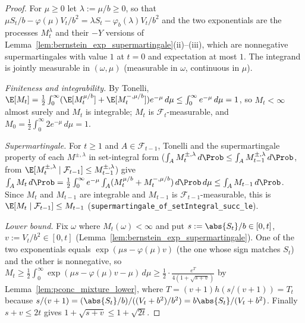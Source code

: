 \begin{proof}
\leanok
For $\mu \ge 0$ let $\lambda := \mu/b \ge 0$, so that $\mu S_t/b - \varphi(\mu)V_t/b^2 = \lambda S_t - \varphi_b(\lambda)V_t/b^2$
and the two exponentials are the processes $M^{\lambda}_t$ and their $-Y$ versions of
Lemma~\ref{lem:bernstein_exp_supermartingale}(ii)--(iii), which are nonnegative supermartingales
with value $1$ at $t = 0$ and expectation at most $1$. The integrand is jointly measurable in
$(\omega, \mu)$ (measurable in $\omega$, continuous in $\mu$).

\emph{Finiteness and integrability.} By Tonelli,
$\E[M_t] = \frac12\int_0^\infty (\E[M^{\mu/b}_t] + \E[M^{-,\mu/b}_t]) e^{-\mu}\,d\mu \le \int_0^\infty e^{-\mu}\, d\mu = 1$,
so $M_t < \infty$ almost surely and $M_t$ is integrable; $M_t$ is $\mathcal F_t$-measurable, and
$M_0 = \frac12\int_0^\infty 2 e^{-\mu}\,d\mu = 1$.

\emph{Supermartingale.} For $t \ge 1$ and $A \in \mathcal F_{t-1}$, Tonelli and the supermartingale
property of each $M^{\pm, \lambda}$ in set-integral form ($\int_A M^{\pm,\lambda}_t\, d\Prob \le \int_A M^{\pm,\lambda}_{t-1}\, d\Prob$,
from $\E[M^{\pm,\lambda}_t \mid \mathcal F_{t-1}] \le M^{\pm,\lambda}_{t-1}$) give
$\int_A M_t\, d\Prob = \frac12 \int_0^\infty e^{-\mu} \int_A (M^{\mu/b}_t + M^{-,\mu/b}_t)\, d\Prob\, d\mu \le \int_A M_{t-1}\, d\Prob$.
Since $M_t$ and $M_{t-1}$ are integrable and $M_{t-1}$ is $\mathcal F_{t-1}$-measurable, this is
$\E[M_t \mid \mathcal F_{t-1}] \le M_{t-1}$ (\texttt{supermartingale\_of\_setIntegral\_succ\_le}).

\emph{Lower bound.} Fix $\omega$ where $M_t(\omega) < \infty$ and put $s := \abs{S_t}/b \in [0, t]$,
$v := V_t/b^2 \in [0, t]$ (Lemma~\ref{lem:bernstein_exp_supermartingale}). One of the two
exponentials equals $\exp(\mu s - \varphi(\mu) v)$ (the one whose sign matches $S_t$) and the other
is nonnegative, so $M_t \ge \frac12 \int_0^\infty \exp(\mu s - \varphi(\mu) v - \mu)\, d\mu \ge \frac12 \cdot \frac{e^{T}}{4(1 + \sqrt{s + v})}$
by Lemma~\ref{lem:pconc_mixture_lower}, where $T = (v + 1)h(s/(v + 1)) = T_t$ because
$s/(v + 1) = (\abs{S_t}/b)/((V_t + b^2)/b^2) = b\abs{S_t}/(V_t + b^2)$. Finally $s + v \le 2t$ gives
$1 + \sqrt{s + v} \le 1 + \sqrt{2t}$.
\end{proof}

